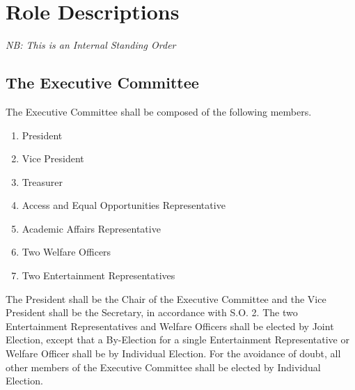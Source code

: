 \chapter{Role Descriptions}
\textit{NB: This is an Internal Standing Order}
\section{The Executive Committee}
\npara The Executive Committee shall be composed of the following members.
\begin{enumerate}
	\item President
	\item Vice President
	\item Treasurer
	\item Access and Equal Opportunities Representative
	\item Academic Affairs Representative
	\item Two Welfare Officers
	\item Two Entertainment Representatives
\end{enumerate}
\npara The President shall be the Chair of the Executive Committee and the Vice President shall be the Secretary, in accordance with S.O. 2.
\npara The two Entertainment Representatives and Welfare Officers shall be elected by Joint Election, except that a By-Election for a single Entertainment Representative or Welfare Officer shall be by Individual Election. For the avoidance of doubt, all other members of the Executive Committee shall be elected by Individual Election. 
